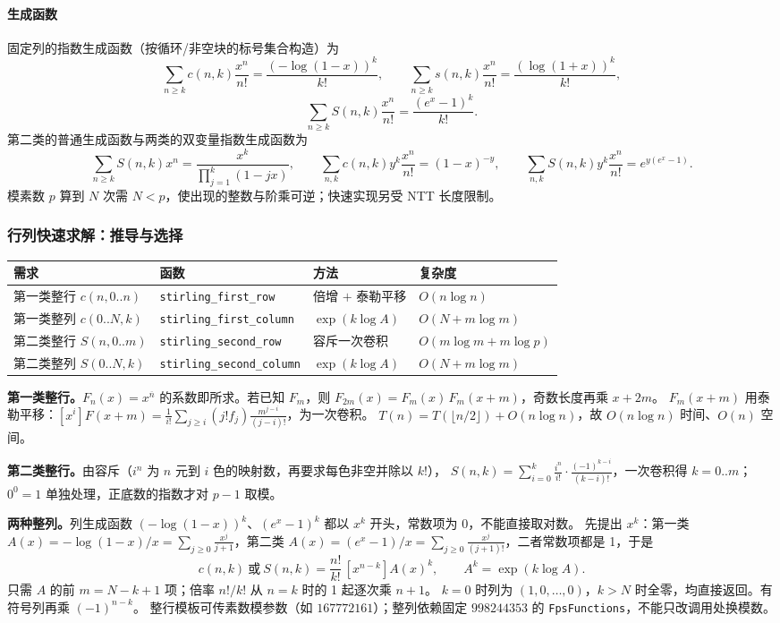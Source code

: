 \paragraph{生成函数} 固定列的指数生成函数（按循环/非空块的标号集合构造）为
\[
 \sum_{n\ge k}c(n,k)\frac{x^n}{n!}=\frac{(-\log(1-x))^k}{k!},\qquad
 \sum_{n\ge k}s(n,k)\frac{x^n}{n!}=\frac{(\log(1+x))^k}{k!},
\]
\[
 \sum_{n\ge k}S(n,k)\frac{x^n}{n!}=\frac{(e^x-1)^k}{k!}.
\]
第二类的普通生成函数与两类的双变量指数生成函数为
\[
 \sum_{n\ge k}S(n,k)x^n=\frac{x^k}{\prod_{j=1}^k(1-jx)},\qquad
 \sum_{n,k}c(n,k)y^k\frac{x^n}{n!}=(1-x)^{-y},\qquad
 \sum_{n,k}S(n,k)y^k\frac{x^n}{n!}=e^{y(e^x-1)}.
\]
模素数 $p$ 算到 $N$ 次需 $N<p$，使出现的整数与阶乘可逆；快速实现另受 NTT 长度限制。

\subsubsection{行列快速求解：推导与选择}
\begin{center}\small
\begin{tabular}{@{}llll@{}}
\toprule
需求 & 函数 & 方法 & 复杂度\\
\midrule
第一类整行 $c(n,0..n)$ & \texttt{stirling\_first\_row} & 倍增 $+$ 泰勒平移 & $O(n\log n)$\\
第一类整列 $c(0..N,k)$ & \texttt{stirling\_first\_column} & $\exp(k\log A)$ & $O(N+m\log m)$\\
第二类整行 $S(n,0..m)$ & \texttt{stirling\_second\_row} & 容斥一次卷积 & $O(m\log m+m\log p)$\\
第二类整列 $S(0..N,k)$ & \texttt{stirling\_second\_column} & $\exp(k\log A)$ & $O(N+m\log m)$\\
\bottomrule
\end{tabular}
\end{center}
\textbf{第一类整行。}$F_n(x)=x^{\overline n}$ 的系数即所求。若已知 $F_m$，则 $F_{2m}(x)=F_m(x)\,F_m(x+m)$，奇数长度再乘 $x+2m$。
$F_m(x+m)$ 用泰勒平移：$[x^i]F(x+m)=\frac1{i!}\sum_{j\ge i}(j!f_j)\frac{m^{j-i}}{(j-i)!}$，为一次卷积。
$T(n)=T(\lfloor n/2\rfloor)+O(n\log n)$，故 $O(n\log n)$ 时间、$O(n)$ 空间。

\textbf{第二类整行。}由容斥（$i^n$ 为 $n$ 元到 $i$ 色的映射数，再要求每色非空并除以 $k!$），
$S(n,k)=\sum_{i=0}^k\frac{i^n}{i!}\cdot\frac{(-1)^{k-i}}{(k-i)!}$，一次卷积得 $k=0..m$；$0^0=1$ 单独处理，正底数的指数才对 $p-1$ 取模。

\textbf{两种整列。}列生成函数 $(-\log(1-x))^k$、$(e^x-1)^k$ 都以 $x^k$ 开头，常数项为 0，不能直接取对数。
先提出 $x^k$：第一类 $A(x)=-\log(1-x)/x=\sum_{j\ge0}\frac{x^j}{j+1}$，第二类 $A(x)=(e^x-1)/x=\sum_{j\ge0}\frac{x^j}{(j+1)!}$，二者常数项都是 1，于是
\[
 c(n,k)\ \text{或}\ S(n,k)=\frac{n!}{k!}\,[x^{n-k}]A(x)^k,\qquad A^k=\exp(k\log A).
\]
只需 $A$ 的前 $m=N-k+1$ 项；倍率 $n!/k!$ 从 $n=k$ 时的 1 起逐次乘 $n+1$。
$k=0$ 时列为 $(1,0,\dots,0)$，$k>N$ 时全零，均直接返回。有符号列再乘 $(-1)^{n-k}$。
整行模板可传素数模参数（如 $167772161$）；整列依赖固定 $998244353$ 的 \texttt{FpsFunctions}，不能只改调用处换模数。




